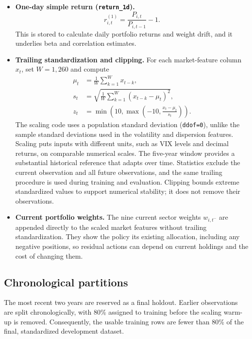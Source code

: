 \documentclass[11pt,letterpaper]{article}
\begin{document}
\begin{itemize}
  \item \textbf{One-day simple return (\texttt{return\_1d}).}
  \[
    r^{(1)}_{i,t}=\frac{P_{i,t}}{P_{i,t-1}}-1.
  \]
  This is stored to calculate daily portfolio returns and weight drift, and
  it underlies beta and correlation estimates. 

  \item \textbf{Trailing standardization and clipping.} For each market-feature
  column $x_t$, set $W=1{,}260$ and compute
  \begin{align*}
    \mu_t &= \frac{1}{W}\sum_{k=1}^{W}x_{t-k}, \\
    s_t &= \sqrt{\frac{1}{W}\sum_{k=1}^{W}(x_{t-k}-\mu_t)^2}, \\
    z_t &= \min\!\left(10,\max\!\left(-10,
      \frac{x_t-\mu_t}{s_t}\right)\right).
  \end{align*}
  The scaling code uses a population standard deviation
  (\texttt{ddof=0}), unlike the sample standard deviations used in the
  volatility and dispersion features. Scaling puts inputs with different
  units, such as VIX levels and decimal returns, on comparable numerical
  scales. The five-year window provides a substantial historical reference
  that adapts over time. Statistics exclude the current observation and all
  future observations, and the same trailing procedure is used during
  training and evaluation. Clipping bounds extreme standardized values to
  support numerical stability; it does not remove their observations.

  \item \textbf{Current portfolio weights.} The nine current sector weights
  $w_{i,t^-}$ are appended directly to the scaled market features without
  trailing standardization. They show the policy its existing allocation,
  including any negative positions, so residual actions can depend on
  current holdings and the cost of changing them.
\end{itemize}

\subsection{Chronological partitions}

The most recent two years are reserved as a final holdout. Earlier observations
are split chronologically, with 80\% assigned to training before the scaling
warm-up is removed. Consequently, the usable training rows are fewer than 80\%
of the final, standardized development dataset.
\end{document}

